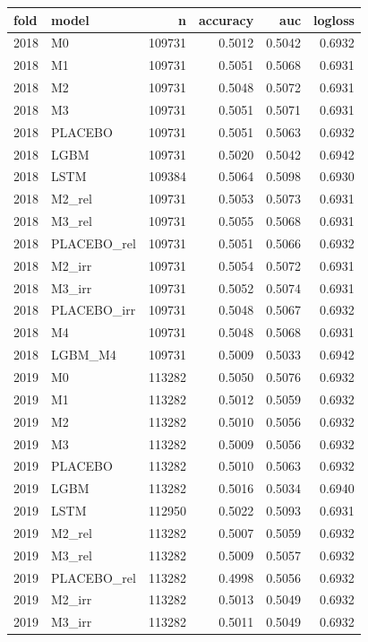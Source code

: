 \begin{tabular}{llrrrr}
\toprule
fold & model & n & accuracy & auc & logloss \\
\midrule
2018 & M0 & 109731 & 0.5012 & 0.5042 & 0.6932 \\
2018 & M1 & 109731 & 0.5051 & 0.5068 & 0.6931 \\
2018 & M2 & 109731 & 0.5048 & 0.5072 & 0.6931 \\
2018 & M3 & 109731 & 0.5051 & 0.5071 & 0.6931 \\
2018 & PLACEBO & 109731 & 0.5051 & 0.5063 & 0.6932 \\
2018 & LGBM & 109731 & 0.5020 & 0.5042 & 0.6942 \\
2018 & LSTM & 109384 & 0.5064 & 0.5098 & 0.6930 \\
2018 & M2\_rel & 109731 & 0.5053 & 0.5073 & 0.6931 \\
2018 & M3\_rel & 109731 & 0.5055 & 0.5068 & 0.6931 \\
2018 & PLACEBO\_rel & 109731 & 0.5051 & 0.5066 & 0.6932 \\
2018 & M2\_irr & 109731 & 0.5054 & 0.5072 & 0.6931 \\
2018 & M3\_irr & 109731 & 0.5052 & 0.5074 & 0.6931 \\
2018 & PLACEBO\_irr & 109731 & 0.5048 & 0.5067 & 0.6932 \\
2018 & M4 & 109731 & 0.5048 & 0.5068 & 0.6931 \\
2018 & LGBM\_M4 & 109731 & 0.5009 & 0.5033 & 0.6942 \\
2019 & M0 & 113282 & 0.5050 & 0.5076 & 0.6932 \\
2019 & M1 & 113282 & 0.5012 & 0.5059 & 0.6932 \\
2019 & M2 & 113282 & 0.5010 & 0.5056 & 0.6932 \\
2019 & M3 & 113282 & 0.5009 & 0.5056 & 0.6932 \\
2019 & PLACEBO & 113282 & 0.5010 & 0.5063 & 0.6932 \\
2019 & LGBM & 113282 & 0.5016 & 0.5034 & 0.6940 \\
2019 & LSTM & 112950 & 0.5022 & 0.5093 & 0.6931 \\
2019 & M2\_rel & 113282 & 0.5007 & 0.5059 & 0.6932 \\
2019 & M3\_rel & 113282 & 0.5009 & 0.5057 & 0.6932 \\
2019 & PLACEBO\_rel & 113282 & 0.4998 & 0.5056 & 0.6932 \\
2019 & M2\_irr & 113282 & 0.5013 & 0.5049 & 0.6932 \\
2019 & M3\_irr & 113282 & 0.5011 & 0.5049 & 0.6932 \\

\end{tabular}
